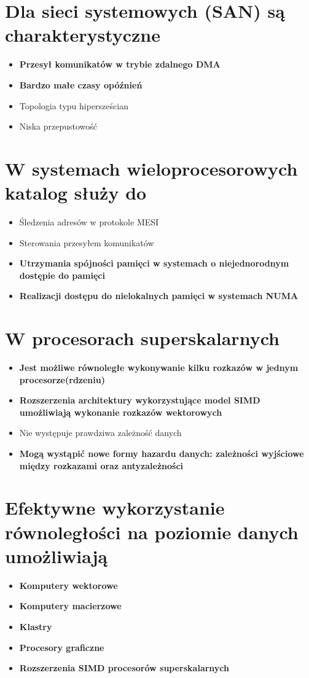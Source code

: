 \documentclass[a4paper,twoside]{article}
\begin{document}
\section{Dla sieci systemowych (SAN) są charakterystyczne}
	\begin{itemize}
    \item \textbf{Przesył komunikatów w trybie zdalnego DMA}
    \item \textbf{Bardzo małe czasy opóźnień}
    \item Topologia typu hipersześcian
    \item Niska przepustowość
    \end{itemize}

\section{W systemach wieloprocesorowych katalog służy do}
	\begin{itemize}
    \item Śledzenia adresów w protokole MESI
    \item Sterowania przesyłem komunikatów
    \item \textbf{Utrzymania spójności pamięci w systemach o niejednorodnym dostępie do pamięci}
    \item \textbf{Realizacji dostępu do nielokalnych pamięci w systemach NUMA}
    \end{itemize}

\section{W procesorach superskalarnych}
	\begin{itemize}
    \item \textbf{Jest możliwe równoległe wykonywanie kilku rozkazów w jednym procesorze(rdzeniu) }
    \item \textbf{Rozszerzenia architektury wykorzystujące model SIMD umożliwiają wykonanie rozkazów wektorowych}
    \item Nie występuje prawdziwa zależność danych
    \item \textbf{Mogą wystąpić nowe formy hazardu danych: zależności wyjściowe między rozkazami oraz antyzależności}
    \end{itemize}

\section{Efektywne wykorzystanie równoległości na poziomie danych umożliwiają}
	\begin{itemize}
    \item \textbf{Komputery wektorowe}
    \item \textbf{Komputery macierzowe}
    \item \textbf{Klastry}
    \item \textbf{Procesory graficzne}
    \item \textbf{Rozszerzenia SIMD procesorów superskalarnych}
    \end{itemize}
\end{document}
